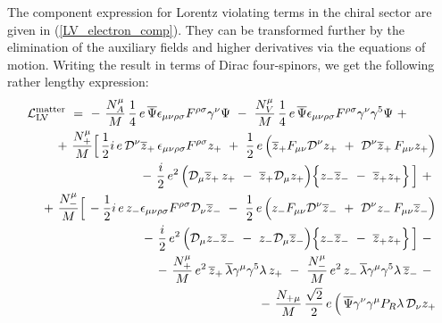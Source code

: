 \documentclass[12pt]{revtex4}
\begin{document}
The component expression for Lorentz violating terms in the chiral sector are given
in (\ref{LV_electron_comp}). They can be transformed further 
by the elimination of the auxiliary fields and higher derivatives 
via the equations of motion. Writing the result in terms of Dirac
four-spinors, we get the following rather lengthy expression:
\begin{eqnarray}
\nonumber
\lefteqn{
     \mathcal{L}_{\mathrm{LV}}^{\mathrm{matter}}  ~= 
~      %
-~
\frac{N_A^\mu}{M}\,
\frac{1}{4} \,e\,
\overline{\Psi} \epsilon_{\mu\nu\rho\sigma}
F^{\rho\sigma} \gamma^\nu \Psi      
~-~
\frac{N_V^\mu}{M}\,
\frac{1}{4} \,e\,
\overline{\Psi} \epsilon_{\mu\nu\rho\sigma}
F^{\rho\sigma} \gamma^\nu \gamma^5 \Psi 
~+~ 
}\\
\nonumber
&&
~+~
\frac{N_+^\mu}{M}
\Big[\,
\frac{1}{2}i \,e \, 
\mathcal{D}^\nu \overline{z}_+ \,
\epsilon_{\mu\nu\rho\sigma}F^{\rho\sigma} z_+ 
~+~
\frac{1}{2}\, e\,
\Big(
  \overline{z}_+ F_{\mu\nu}
  \mathcal{D}^\nu z_+ 
  ~+~
  \mathcal{D}^\nu \overline{z}_+ \,
  F_{\mu\nu} z_+
\Big) 
\\
\nonumber
&&
               \qquad
~-~
\frac{i}{2}\, e^2\,
\Big(
  \mathcal{D}_\mu \overline{z}_+ \,
   z_+ 
  ~-~
  \overline{z}_+ \mathcal{D}_\mu z_+
\Big)
\Big\{
  z_-  \overline{z}_- 
  ~-~
  \overline{z}_+  z_+
\Big\}
\,\Big] ~+~ \\
\nonumber
&&
~+~
\frac{N_-^\mu}{M}
\Big[\,
- \frac{1}{2} i\, e\,
z_- \epsilon_{\mu\nu\rho\sigma}F^{\rho\sigma}
\mathcal{D}_\nu \overline{z}_- 
~-~
\frac{1}{2}\, e\,
\Big(
  z_- F_{\mu\nu}\mathcal{D}^\nu \overline{z}_- 
  ~+~
  \mathcal{D}^\nu z_- \,
  F_{\mu\nu} \overline{z}_- 
\Big)
\\
\nonumber
&&
               \qquad
~-~ 
\frac{i}{2}\, e^2\,
\Big(
  \mathcal{D}_\mu z_- \overline{z}_-
  ~-~
  z_- \mathcal{D}_\mu \overline{z}_-
\Big)
\Big\{
  z_- \overline{z}_- 
  ~-~
  \overline{z}_+ z_+
\Big\}
\,\Big]
~-~ \\
\nonumber
&&
~-~
\frac{N_+^\mu}{M}\, e^2\,
\overline{z}_+ \, \overline{\lambda} \gamma^\mu \gamma^5 
\lambda\, z_+ 
~-~
\frac{N_-^\mu}{M}\, e^2\,
z_-\, \overline{\lambda}\gamma^\mu\gamma^5
\lambda\, \overline{z}_-
~-~ \\
\nonumber
&&
~-~
\frac{N_{+\mu}}{M}\,
\frac{\sqrt{2}}{2}\, e\,
\Big(\,
\overline{\Psi} \gamma^\nu\gamma^\mu P_R
\lambda \, \mathcal{D}_\nu z_+ 

\end{eqnarray}
\end{document}
